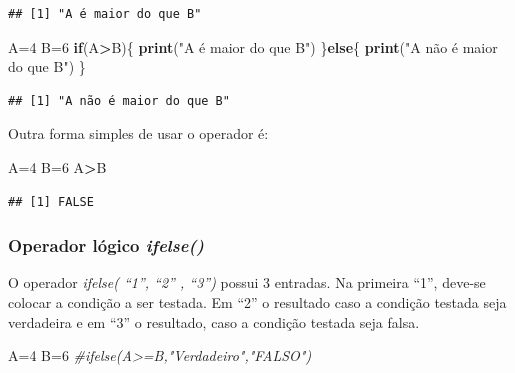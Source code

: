 \documentclass[
]{book}
\newenvironment{Shaded}{\begin{snugshade}}{\end{snugshade}}
\newcommand{\CommentTok}[1]{\textcolor[rgb]{0.56,0.35,0.01}{\textit{#1}}}
\newcommand{\ControlFlowTok}[1]{\textcolor[rgb]{0.13,0.29,0.53}{\textbf{#1}}}
\newcommand{\DecValTok}[1]{\textcolor[rgb]{0.00,0.00,0.81}{#1}}
\newcommand{\KeywordTok}[1]{\textcolor[rgb]{0.13,0.29,0.53}{\textbf{#1}}}
\newcommand{\NormalTok}[1]{#1}
\newcommand{\OperatorTok}[1]{\textcolor[rgb]{0.81,0.36,0.00}{\textbf{#1}}}
\newcommand{\StringTok}[1]{\textcolor[rgb]{0.31,0.60,0.02}{#1}}
\theoremstyle{definition}
\theoremstyle{definition}
\theoremstyle{definition}
\theoremstyle{remark}
\begin{document}
\begin{verbatim}
## [1] "A é maior do que B"
\end{verbatim}

\begin{Shaded}
\begin{Highlighting}[]
\NormalTok{A=}\DecValTok{4}
\NormalTok{B=}\DecValTok{6}
\ControlFlowTok{if}\NormalTok{(A}\OperatorTok{>}\NormalTok{B)\{}
  \KeywordTok{print}\NormalTok{(}\StringTok{"A é maior do que B"}\NormalTok{)}
\NormalTok{  \}}\ControlFlowTok{else}\NormalTok{\{}
    \KeywordTok{print}\NormalTok{(}\StringTok{"A não é maior do que B"}\NormalTok{)}
\NormalTok{  \}}
\end{Highlighting}
\end{Shaded}

\begin{verbatim}
## [1] "A não é maior do que B"
\end{verbatim}

Outra forma simples de usar o operador é:

\begin{Shaded}
\begin{Highlighting}[]
\NormalTok{A=}\DecValTok{4}
\NormalTok{B=}\DecValTok{6}
\NormalTok{A}\OperatorTok{>}\NormalTok{B}
\end{Highlighting}
\end{Shaded}

\begin{verbatim}
## [1] FALSE
\end{verbatim}

\hypertarget{operador-luxf3gico-ifelse}{%
\subsubsection{\texorpdfstring{Operador lógico \emph{ifelse()}}{Operador lógico ifelse()}}\label{operador-luxf3gico-ifelse}}

O operador \emph{ifelse( ``1'', ``2'' , ``3'')} possui 3 entradas. Na primeira ``1'', deve-se colocar a condição a ser testada. Em ``2'' o resultado caso a condição testada seja verdadeira e em ``3'' o resultado, caso a condição testada seja falsa.

\begin{Shaded}
\begin{Highlighting}[]
\NormalTok{A=}\DecValTok{4}
\NormalTok{B=}\DecValTok{6}
\CommentTok{#ifelse(A>=B,"Verdadeiro","FALSO")}
\end{Highlighting}
\end{Shaded}
\end{document}
